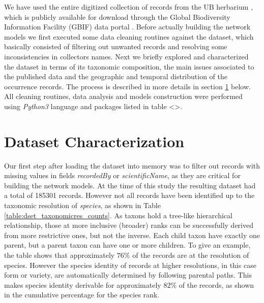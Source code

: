 We have used the entire digitized collection of records from the UB herbarium \cite{gbif_ubdataset}, which is publicly available for download through the Global Biodiversity Information Facility (GBIF) data portal \cite{gbif}.
%
Before actually building the network models we first executed some data cleaning routines against the dataset, which basically consisted of filtering out unwanted records and resolving some inconsistencies in collectors names.
%
Next we briefly explored and characterized the dataset in terms of its taxonomic composition, the main issues associated to the published data and the geographic and temporal distribution of the occurrence records.
%
The process is described in more details in section \ref{section:ub_characterization} below.
%
All cleaning routines, data analysis and models construction were performed using \textit{Python3} language and packages listed in table <>. %









\section{Dataset Characterization}\label{section:ub_characterization}


Our first step after loading the dataset into memory was to filter out records with missing values in fields \textit{recordedBy} or \textit{scientificName}, as they are critical for building the network models.
At the time of this study the resulting dataset had a total of 185301 records. However not all records have been identified up to the taxonomic resolution of \textit{species}, as shown in Table \ref{table:dset_taxonomicres_counts}. 
As taxons hold a tree-like hierarchical relationship, those at more inclusive (broader) ranks can be successfully derived from more restrictive ones, but not the inverse. Each child taxon have exactly one parent, but a parent taxon can have one or more children.
To give an example, the table shows that approximately $76\%$ of the records are at the resolution of species. However the species identity of records at higher resolutions, in this case form or variety, are automatically determined by following parental paths. This makes species identity derivable for approximately $82\%$ of the records, as shown in the cumulative percentage for the species rank.

